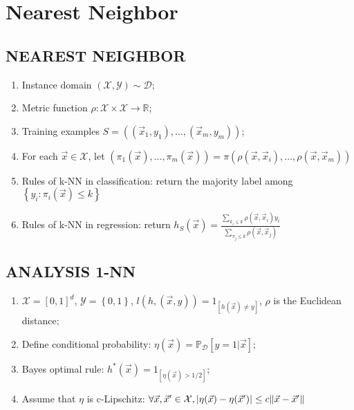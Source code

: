 
\section{Nearest Neighbor}%

\subsection{NEAREST NEIGHBOR}%

\begin{enumerate}
    \item Instance domain $ (\mathcal{X}, \mathcal{Y}) \sim \mathcal{D} $;
    \item Metric function $ \rho: \mathcal{X} \times \mathcal{X} \rightarrow \mathbb{R} $;
    \item Training examples $ S = ((\vec{x}_1, y_1), \ldots, (\vec{x}_m, y_m)) $;
    \item For each $ \vec{x} \in \mathcal{X} $, let $ (\pi_1(\vec{x}), \ldots, \pi_m(\vec{x})) = \pi(\rho(\vec{x}, \vec{x}_i), \ldots, \rho(\vec{x}, \vec{x}_m)) $
    \item Rules of {k-NN} in classification: return the majority label among \\
        $ \left\{ y_{i}: \pi_{i}(\vec{x}) \le k \right\} $
    \item Rules of {k-NN} in regression: return $ h_S(\vec{x}) = \frac{\sum^{}_{\pi_i \le k} \rho(\vec{x}, \vec{x}_{i}) y_{i}}{ \sum^{}_{\pi_j \le k} \rho(\vec{x}, \vec{x}_{j})}  $
\end{enumerate}

\subsection{ANALYSIS {1-NN}}%

\begin{enumerate}
    \item $ \mathcal{X} = { [0, 1] }^d $, $ \mathcal{Y} = \left\{ 0, 1 \right\} $, $ l(h, (\vec{x}, y)) = 1 _{ [h(\vec{x})\ne y]} $, $ \rho $ is the Euclidean distance;
    \item Define conditional probability: $ \eta(\vec{x}) = \mathbb{P}_{\mathcal{D}} \left[ y = 1 | \vec{x} \right] $;
    \item Bayes optimal rule: $ h^*(\vec{x}) = 1_{[\eta(\vec{x}) > 1/2]} $;
    \item Assume that $ \eta $ is c-Lipschitz: $ \forall \vec{x}, \vec{x}' \in \mathcal{X}, \left| \eta(\vec{x}) - \eta(\vec{x}') \right| \le c \Arrowvert \vec{x} - \vec{x}' \Arrowvert $
\end{enumerate}

